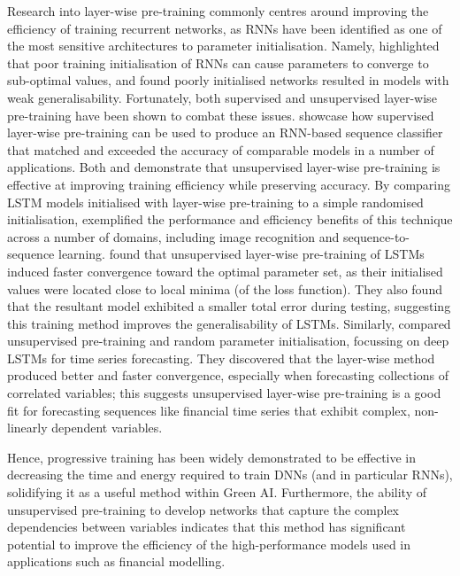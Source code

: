 \documentclass[a4paper, 11pt]{report}
\begin{document}
    Research into layer-wise pre-training commonly centres around improving the efficiency of training recurrent networks, as RNNs have been identified as one of the most sensitive architectures to parameter initialisation. Namely, \citet{xu-2018} highlighted that poor training initialisation of RNNs can cause parameters to converge to sub-optimal values, and \citet{ienco-2019} found poorly initialised networks resulted in models with weak generalisability. Fortunately, both supervised and unsupervised layer-wise pre-training have been shown to combat these issues. \citet{ienco-2019} showcase how supervised layer-wise pre-training can be used to produce an RNN-based sequence classifier that matched and exceeded the accuracy of comparable models in a number of applications. Both \citet{xu-2018} and \citet{sagheer-2019} demonstrate that unsupervised layer-wise pre-training is effective at improving training efficiency while preserving accuracy. By comparing LSTM models initialised with layer-wise pre-training to a simple randomised initialisation, \citet{xu-2018} exemplified the performance and efficiency benefits of this technique across a number of domains, including image recognition and sequence-to-sequence learning. \citet{xu-2018} found that unsupervised layer-wise pre-training of LSTMs induced faster convergence toward the optimal parameter set, as their initialised values were located close to local minima (of the loss function). They also found that the resultant model exhibited a smaller total error during testing, suggesting this training method improves the generalisability of LSTMs. Similarly, \citet{sagheer-2019} compared unsupervised pre-training and random parameter initialisation, focussing on deep LSTMs for time series forecasting. They discovered that the layer-wise method produced better and faster convergence, especially when forecasting collections of correlated variables; this suggests unsupervised layer-wise pre-training is a good fit for forecasting sequences like financial time series that exhibit complex, non-linearly dependent variables.

    Hence, progressive training has been widely demonstrated to be effective in decreasing the time and energy required to train DNNs (and in particular RNNs), solidifying it as a useful method within Green AI. Furthermore, the ability of unsupervised pre-training to develop networks that capture the complex dependencies between variables indicates that this method has significant potential to improve the efficiency of the high-performance models used in applications such as financial modelling.
\end{document}
